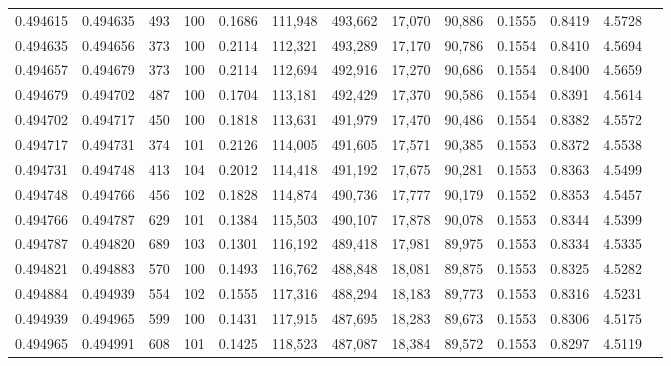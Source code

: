 \begin{tabular}{rrrrrrrrrrrrr}
0.494615 & 0.494635 &   493 & 100 &                                     0.1686 & 111,948 & 493,662 &  17,070 &  90,886 & 0.1555 & 0.8419 & 4.5728 \\
0.494635 & 0.494656 &   373 & 100 &                                     0.2114 & 112,321 & 493,289 &  17,170 &  90,786 & 0.1554 & 0.8410 & 4.5694 \\
0.494657 & 0.494679 &   373 & 100 &                                     0.2114 & 112,694 & 492,916 &  17,270 &  90,686 & 0.1554 & 0.8400 & 4.5659 \\
0.494679 & 0.494702 &   487 & 100 &                                     0.1704 & 113,181 & 492,429 &  17,370 &  90,586 & 0.1554 & 0.8391 & 4.5614 \\
0.494702 & 0.494717 &   450 & 100 &                                     0.1818 & 113,631 & 491,979 &  17,470 &  90,486 & 0.1554 & 0.8382 & 4.5572 \\
0.494717 & 0.494731 &   374 & 101 &                                     0.2126 & 114,005 & 491,605 &  17,571 &  90,385 & 0.1553 & 0.8372 & 4.5538 \\
0.494731 & 0.494748 &   413 & 104 &                                     0.2012 & 114,418 & 491,192 &  17,675 &  90,281 & 0.1553 & 0.8363 & 4.5499 \\
0.494748 & 0.494766 &   456 & 102 &                                     0.1828 & 114,874 & 490,736 &  17,777 &  90,179 & 0.1552 & 0.8353 & 4.5457 \\
0.494766 & 0.494787 &   629 & 101 &                                     0.1384 & 115,503 & 490,107 &  17,878 &  90,078 & 0.1553 & 0.8344 & 4.5399 \\
0.494787 & 0.494820 &   689 & 103 &                                     0.1301 & 116,192 & 489,418 &  17,981 &  89,975 & 0.1553 & 0.8334 & 4.5335 \\
0.494821 & 0.494883 &   570 & 100 &                                     0.1493 & 116,762 & 488,848 &  18,081 &  89,875 & 0.1553 & 0.8325 & 4.5282 \\
0.494884 & 0.494939 &   554 & 102 &                                     0.1555 & 117,316 & 488,294 &  18,183 &  89,773 & 0.1553 & 0.8316 & 4.5231 \\
0.494939 & 0.494965 &   599 & 100 &                                     0.1431 & 117,915 & 487,695 &  18,283 &  89,673 & 0.1553 & 0.8306 & 4.5175 \\
0.494965 & 0.494991 &   608 & 101 &                                     0.1425 & 118,523 & 487,087 &  18,384 &  89,572 & 0.1553 & 0.8297 & 4.5119 \\

\end{tabular}

